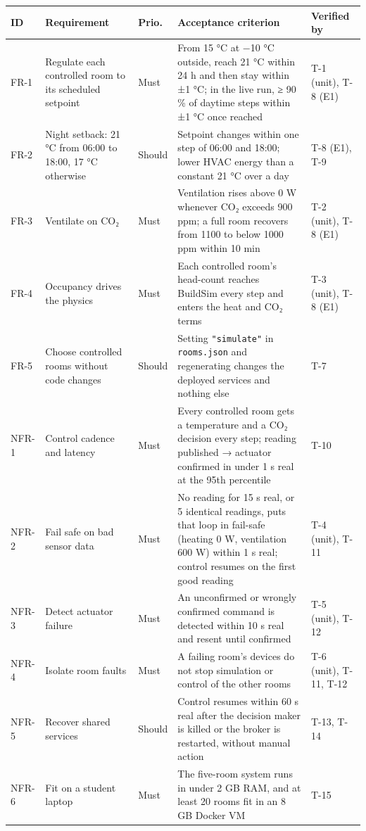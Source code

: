 \documentclass[11pt]{article}
\makeatletter
\DeclareRobustCommand{\_}{\ifmmode\nfss@text{\textunderscore}\else\textunderscore\allowbreak\fi}
\newcommand{\file}[1]{\texttt{#1}}
\makeatother
\begin{document}
\begin{longtable}[]{@{}
  >{\raggedright\arraybackslash}p{}
  >{\raggedright\arraybackslash}p{}
  >{\raggedright\arraybackslash}p{}
  >{\raggedright\arraybackslash}p{}
  >{\raggedright\arraybackslash}p{}@{}}
\toprule
\textbf{ID} & \textbf{Requirement} & \textbf{Prio.} & \textbf{Acceptance criterion} & \textbf{Verified by} \\
\midrule
\endhead
FR-1 & Regulate each controlled room to its scheduled setpoint & Must &
  From 15 °C at −10 °C outside, reach 21 °C within 24 h and then stay within
  ±1 °C; in the live run, ≥ 90 \% of daytime steps within ±1 °C once reached &
  T-1 (unit), T-8 (E1) \\
FR-2 & Night setback: 21 °C from 06:00 to 18:00, 17 °C otherwise & Should &
  Setpoint changes within one step of 06:00 and 18:00; lower HVAC energy than a
  constant 21 °C over a day & T-8 (E1), T-9 \\
FR-3 & Ventilate on CO₂ & Must &
  Ventilation rises above 0 W whenever CO₂ exceeds 900 ppm; a full room recovers
  from 1100 to below 1000 ppm within 10 min & T-2 (unit), T-8 (E1) \\
FR-4 & Occupancy drives the physics & Must &
  Each controlled room's head-count reaches BuildSim every step and enters the
  heat and CO₂ terms & T-3 (unit), T-8 (E1) \\
FR-5 & Choose controlled rooms without code changes & Should &
  Setting \texttt{"simulate"} in \file{rooms.json} and regenerating changes the
  deployed services and nothing else & T-7 \\
NFR-1 & Control cadence and latency & Must &
  Every controlled room gets a temperature and a CO₂ decision every step; reading
  published → actuator confirmed in under 1 s real at the 95th percentile & T-10 \\
NFR-2 & Fail safe on bad sensor data & Must &
  No reading for 15 s real, or 5 identical readings, puts that loop in fail-safe
  (heating 0 W, ventilation 600 W) within 1 s real; control resumes on the first
  good reading & T-4 (unit), T-11 \\
NFR-3 & Detect actuator failure & Must &
  An unconfirmed or wrongly confirmed command is detected within 10 s real and
  resent until confirmed & T-5 (unit), T-12 \\
NFR-4 & Isolate room faults & Must &
  A failing room's devices do not stop simulation or control of the other rooms &
  T-6 (unit), T-11, T-12 \\
NFR-5 & Recover shared services & Should &
  Control resumes within 60 s real after the decision maker is killed or the
  broker is restarted, without manual action & T-13, T-14 \\
NFR-6 & Fit on a student laptop & Must &
  The five-room system runs in under 2 GB RAM, and at least 20 rooms fit in an
  8 GB Docker VM & T-15 \\
\bottomrule
\end{longtable}
\end{document}
